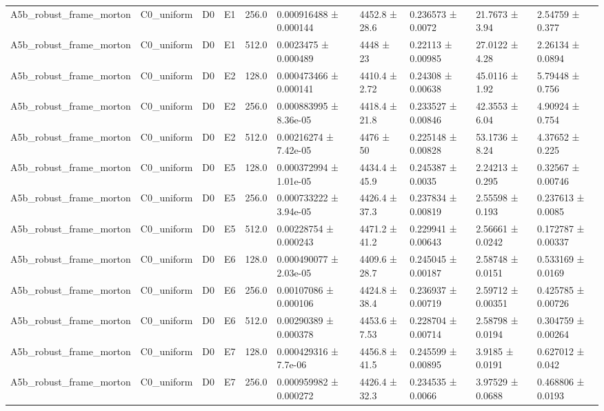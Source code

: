 \begin{table}
\begin{tabular}{llllllllll}
A5b\_robust\_frame\_morton & C0\_uniform & D0 & E1 & 256.0 & 0.000916488 ± 0.000144 & 4452.8 ± 28.6 & 0.236573 ± 0.0072 & 21.7673 ± 3.94 & 2.54759 ± 0.377 \\
A5b\_robust\_frame\_morton & C0\_uniform & D0 & E1 & 512.0 & 0.0023475 ± 0.000489 & 4448 ± 23 & 0.22113 ± 0.00985 & 27.0122 ± 4.28 & 2.26134 ± 0.0894 \\
A5b\_robust\_frame\_morton & C0\_uniform & D0 & E2 & 128.0 & 0.000473466 ± 0.000141 & 4410.4 ± 2.72 & 0.24308 ± 0.00638 & 45.0116 ± 1.92 & 5.79448 ± 0.756 \\
A5b\_robust\_frame\_morton & C0\_uniform & D0 & E2 & 256.0 & 0.000883995 ± 8.36e-05 & 4418.4 ± 21.8 & 0.233527 ± 0.00846 & 42.3553 ± 6.04 & 4.90924 ± 0.754 \\
A5b\_robust\_frame\_morton & C0\_uniform & D0 & E2 & 512.0 & 0.00216274 ± 7.42e-05 & 4476 ± 50 & 0.225148 ± 0.00828 & 53.1736 ± 8.24 & 4.37652 ± 0.225 \\
A5b\_robust\_frame\_morton & C0\_uniform & D0 & E5 & 128.0 & 0.000372994 ± 1.01e-05 & 4434.4 ± 45.9 & 0.245387 ± 0.0035 & 2.24213 ± 0.295 & 0.32567 ± 0.00746 \\
A5b\_robust\_frame\_morton & C0\_uniform & D0 & E5 & 256.0 & 0.000733222 ± 3.94e-05 & 4426.4 ± 37.3 & 0.237834 ± 0.00819 & 2.55598 ± 0.193 & 0.237613 ± 0.0085 \\
A5b\_robust\_frame\_morton & C0\_uniform & D0 & E5 & 512.0 & 0.00228754 ± 0.000243 & 4471.2 ± 41.2 & 0.229941 ± 0.00643 & 2.56661 ± 0.0242 & 0.172787 ± 0.00337 \\
A5b\_robust\_frame\_morton & C0\_uniform & D0 & E6 & 128.0 & 0.000490077 ± 2.03e-05 & 4409.6 ± 28.7 & 0.245045 ± 0.00187 & 2.58748 ± 0.0151 & 0.533169 ± 0.0169 \\
A5b\_robust\_frame\_morton & C0\_uniform & D0 & E6 & 256.0 & 0.00107086 ± 0.000106 & 4424.8 ± 38.4 & 0.236937 ± 0.00719 & 2.59712 ± 0.00351 & 0.425785 ± 0.00726 \\
A5b\_robust\_frame\_morton & C0\_uniform & D0 & E6 & 512.0 & 0.00290389 ± 0.000378 & 4453.6 ± 7.53 & 0.228704 ± 0.00714 & 2.58798 ± 0.0194 & 0.304759 ± 0.00264 \\
A5b\_robust\_frame\_morton & C0\_uniform & D0 & E7 & 128.0 & 0.000429316 ± 7.7e-06 & 4456.8 ± 41.5 & 0.245599 ± 0.00895 & 3.9185 ± 0.0191 & 0.627012 ± 0.042 \\
A5b\_robust\_frame\_morton & C0\_uniform & D0 & E7 & 256.0 & 0.000959982 ± 0.000272 & 4426.4 ± 32.3 & 0.234535 ± 0.0066 & 3.97529 ± 0.0688 & 0.468806 ± 0.0193 \\

\end{tabular}
\end{table}

